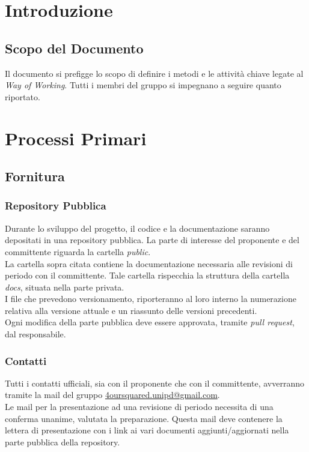 \documentclass[a4paper, 12pt]{article}
\begin{document}
\makefrontpage \makeversioni
\tableofcontents
\newpage

\section{Introduzione}
\subsection{Scopo del Documento}
Il documento si prefigge lo scopo di definire i metodi e le attività chiave legate al \textit{Way of Working}. Tutti i membri del gruppo si impegnano a seguire quanto riportato.

\section{Processi Primari}
\subsection{Fornitura}
\subsubsection{Repository Pubblica}
Durante lo sviluppo del progetto, il codice e la documentazione saranno depositati in una repository pubblica. La parte di interesse del proponente e del committente riguarda la cartella \textit{public}. \\
La cartella sopra citata contiene la documentazione necessaria alle revisioni di periodo con il committente. Tale cartella rispecchia la struttura della cartella \textit{docs}, situata nella parte privata. \\
I file che prevedono versionamento, riporteranno al loro interno la numerazione relativa alla versione attuale e un riassunto delle versioni precedenti. \\ 
Ogni modifica della parte pubblica deve essere approvata, tramite \textit{pull request}, dal responsabile.

\subsubsection{Contatti}
Tutti i contatti ufficiali, sia con il proponente che con il committente, avverranno tramite la mail del gruppo \href{mailto:4oursquared.unipd@gmail.com}{4oursquared.unipd@gmail.com}.\\
Le mail per la presentazione ad una revisione di periodo necessita di una conferma unanime, valutata la preparazione. Questa mail deve contenere la lettera di presentazione con i link ai vari documenti aggiunti/aggiornati nella parte pubblica della repository.
\end{document}
